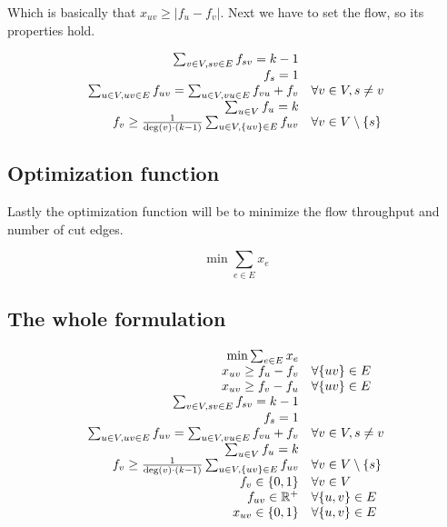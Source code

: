 \documentclass{article}
\theoremstyle{plain}
\theoremstyle{plain}
\theoremstyle{remark}
\begin{document}
	Which is basically that $x_{uv} \geq |f_u - f_v|$. Next we have to set the flow, so its properties hold.
	
	$$
	\begin{array}{r l}
		\sum_{v \in V, sv \in E} f_{sv} = k-1 \\
		f_s = 1 \\
		\sum_{u \in V, uv \in E} f_{uv} = \sum_{u \in V, vu \in E} f_{vu} + f_v & \forall v \in V, s \neq v \\
		\sum_{u \in V} f_u = k \\
		f_{v} \geq \frac{1}{\deg(v) \cdot(k-1)} \sum_{u \in V, \{uv\} \in E} f_{uv} & \forall v \in V \setminus \{s\}
	\end{array}
	$$
	
	\subsection{Optimization function}
	
	Lastly the optimization function will be to minimize the flow throughput and number of cut edges.
	
	$$
	\min \sum_{e \in E} x_e %
	$$
	
	\subsection{The whole formulation}
	
	\begin{equation}
		\begin{array}{r l}
			\min \sum_{e \in E} x_e \\
			x_{uv} \geq f_u - f_v & \forall \{uv\} \in E\\
			x_{uv} \geq f_v - f_u & \forall \{uv\} \in E\\
			\sum_{v \in V, sv \in E} f_{sv} = k-1 \\
			f_s = 1 \\
			\sum_{u \in V, uv \in E} f_{uv} = \sum_{u \in V, vu \in E} f_{vu} + f_v & \forall v \in V, s \neq v \\
			\sum_{u \in V} f_u = k \\
			f_{v} \geq \frac{1}{\deg(v) \cdot(k-1)} \sum_{u \in V, \{uv\} \in E} f_{uv} & \forall v \in V \setminus \{s\} \\
			f_v \in \{0,1\} & \forall v \in V \\
			f_{uv} \in \mathbb{R}^+ & \forall \{u,v\} \in E \\
			x_{uv} \in \{0,1\} & \forall \{u,v\} \in E
		\end{array}
	\end{equation}
	
\end{document}
